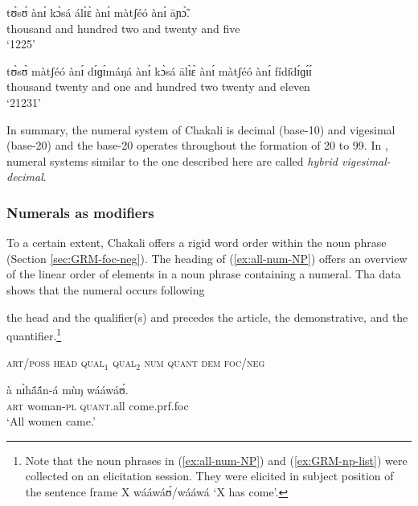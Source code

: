 \begin{exe}
\begin{exe}
\begin{exe}
{\begin{exe}
\begin{exe}
\begin{exe}
\begin{exe}
\begin{exe}
\begin{exe}
\begin{exe}
\begin{exe}
\begin{exe}
\ex\label{ex:1225}
\gll tʊ̀sʊ́  ànɪ́   kɔ̀sá  álɪ̀ɛ̀   ànɪ́  màtʃéó  ànɪ́  āɲɔ̃̀.\\
    {thousand}  {and}  {hundred}  {two}  {and}  {twenty}  {and} {five}\\
\glt `1225'

\ex\label{ex:21231}
\gll tʊ̀sʊ̀  màtʃéó   ànɪ́  dɪ́ɡɪ́máŋá ànɪ́  kɔ̀sá  ālɪ̀ɛ̀  ànɪ́ màtʃéó  ànɪ́     
fídɪ̄dɪ́ɡɪ́ɪ́ \\
    {thousand}   {twenty}   {and} {one}  {and}  {hundred}  {two}  {twenty} 
{and} {eleven}\\
\glt `21231'


\z
\z

In summary,  the 
numeral system of Chakali is decimal (base-10) and vigesimal (base-20) and the 
base-20  operates throughout the formation of 20 to 99. In
\citet{Comr08}, numeral systems similar to the one described here are called
\textit{hybrid vigesimal-decimal}.


\subsubsection{Numerals as modifiers}
\label{sec:NUM-npstruc}

To a certain extent, Chakali offers a rigid word order within the noun phrase (Section 
\ref{sec:GRM-foc-neg}). The heading of (\ref{ex:all-num-NP}) offers an overview of  the linear 
order 
of elements in a noun phrase containing a numeral. Tha data shows that the numeral occurs following 
 
the head and the qualifier(s) and precedes the article, the demonstrative,  and the 
quantifier.\footnote{Note that the noun phrases in  (\ref{ex:all-num-NP}) and  
(\ref{ex:GRM-np-list}) were collected on an elicitation session. 
They were elicited in subject position of the sentence frame {\sls X 
wááwáʊ́/wááwá} `X has come'.}


\ea\label{ex:all-num-NP}{\rm  \textsc{art/poss}    \textsc{head}    \textsc{qual$_\textrm{1}$}    
\textsc{ qual$_\textrm{2}$}    \textsc {num}   \textsc{quant}      \textsc{dem}      
\textsc{foc/neg}\\}

  \ea\label{ex:all-w}
\gll à nɪ̀hã́ã́n-á mùŋ wááwáʊ́.\\
\textsc{art} {woman-\textsc{pl}} \textsc{quant}.all come.{\sc prf.foc}\\
\glt `All women came.'


\end{exe}
\end{exe}
\end{exe}
\end{exe}
\end{exe}
\end{exe}
\end{exe}
\end{exe}
\end{exe}}
\end{exe}
\end{exe}
\end{exe}
